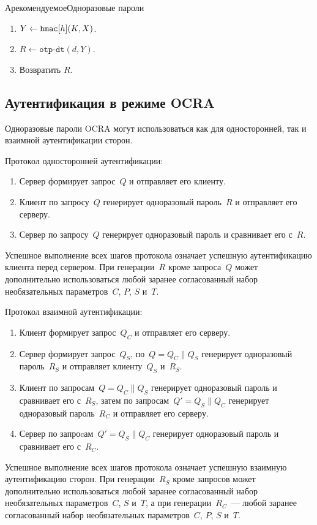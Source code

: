 \begin{appendix}{А}{рекомендуемое}{Одноразовые пароли}
\begin{enumerate}
\item
$Y\leftarrow\texttt{hmac}[h](K,X)$.

\item
$R\leftarrow\texttt{otp-dt}(d, Y)$.

\item
Возвратить $R$.
\end{enumerate}

\subsection{Аутентификация в режиме OCRA}\label{OTP.Auth}

Одноразовые пароли OCRA могут использоваться как для
односторонней, так и взаимной аутентификации сторон.

Протокол односторонней аутентификации:
\begin{enumerate}
\item 
Сервер формирует запрос~$Q$ и отправляет его клиенту.

\item 
Клиент по запросу~$Q$ генерирует одноразовый пароль~$R$
и отправляет его серверу.

\item 
Сервер по запросу~$Q$ генерирует 
одноразовый пароль и сравнивает его с~$R$.
\end{enumerate}

Успешное выполнение всех шагов протокола означает 
успешную аутентификацию клиента перед сервером.
%
При генерации~$R$ кроме запроса~$Q$ 
может дополнительно использоваться любой заранее 
согласованный набор необязательных параметров~$C$, $P$, $S$ и~$T$.

Протокол взаимной аутентификации:
\begin{enumerate}
\item  
Клиент формирует запрос~$Q_C$ и отправляет его серверу.

\item 
Сервер формирует запрос~$Q_S$,
по~$Q=Q_C \parallel Q_S$ генерирует одноразовый пароль~$R_S$
и отправляет клиенту~$Q_S$ и~$R_S$.

\item 
Клиент по запросам~$Q=Q_C \parallel Q_S$ генерирует 
одноразовый пароль и сравнивает его с~$R_S$,
затем по запросам~$Q'=Q_S \parallel Q_C$ генерирует
одноразовый пароль~$R_C$ и отправляет его серверу.

\item 
Сервер по запроcам~$Q'=Q_S \parallel Q_C$ генерирует 
одноразовый пароль и сравнивает его с~$R_C$.
\end{enumerate}

Успешное выполнение всех шагов протокола означает 
успешную взаимную аутентификацию сторон.
При генерации~$R_S$ кроме запросов
может дополнительно использоваться любой заранее согласованный 
набор необязательных параметров~$C$, $S$ и~$T$, 
а при генерации~$R_C$~---  любой заранее согласованный 
набор необязательных параметров~$C$, $P$, $S$ и~$T$.


\end{appendix}
